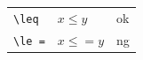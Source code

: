 \documentclass[preview]{standalone}
\newcommand{\tA}[1]{\textcolor{cA}{#1}}
\newcommand{\tD}[1]{\textcolor{cD}{#1}}
\begin{document}
\begin{table}[h]
	\centering
	\begin{tabular}{lll}
		\verb|\leq|  & $x \leq y$  & \tA{ok} \\
		\verb|\le =| & $x \le = y$ & \tD{ng} \\
	\end{tabular}
\end{table}
\end{document}
